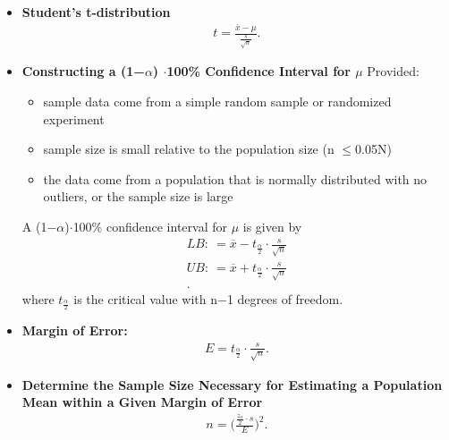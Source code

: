 \documentclass{report}
\begin{document}
     \begin{itemize}
        \item \textbf{Student’s t-distribution}
            \begin{align*}
               t = \frac{\overline{x}-\mu}{\frac{s}{\sqrt{n}}} 
            .\end{align*}
        \item \textbf{Constructing a (1−$\alpha $) $ \cdot $100\% Confidence Interval for $\mu$}
            Provided:
            \begin{itemize}
                \item sample data come from a simple random sample or randomized experiment
                \item sample size is small relative to the population size (n $ \leq $0.05N)
                \item the data come from a population that is normally distributed with no outliers, or the sample size is large
            \end{itemize}
            A (1−$\alpha $)$\cdot$100\% confidence interval for $\mu$ is given by
            \begin{align*}
                LB:\ = \overline{x}  - t_{\frac{\alpha}{2}} \cdot \frac{s}{\sqrt{n}} \\
                UB:\ = \overline{x}  + t_{\frac{\alpha}{2}} \cdot \frac{s}{\sqrt{n}} \\
            .\end{align*}
            where $t_{\frac{\alpha}{2}} $ is the critical value with n−1 degrees of freedom.
        \item \textbf{Margin of Error:}
            \begin{align*}
                E = t_{\frac{\alpha}{2}} \cdot \frac{s}{\sqrt{n}}
            .\end{align*}
        \item \textbf{Determine the Sample Size Necessary for Estimating a Population Mean within a Given Margin of Error}
            \begin{align*}
                n = \bigg(\frac{\frac{z_{\alpha}}{2}\cdot s}{E}\bigg)^{2}
            .\end{align*}
     \end{itemize}
\end{document}
